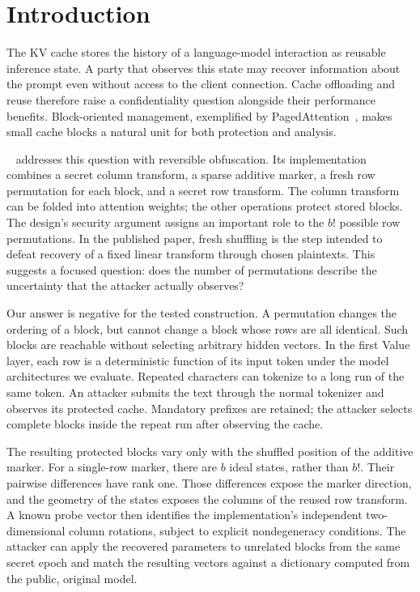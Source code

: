 \section{Introduction}
The KV cache stores the history of a language-model interaction as reusable inference state. A party that observes this state may recover information about the prompt even without access to the client connection. Cache offloading and reuse therefore raise a confidentiality question alongside their performance benefits. Block-oriented management, exemplified by PagedAttention~\cite{paged}, makes small cache blocks a natural unit for both protection and analysis.

\scheme{}~\cite{kvcloak} addresses this question with reversible obfuscation. Its implementation combines a secret column transform, a sparse additive marker, a fresh row permutation for each block, and a secret row transform. The column transform can be folded into attention weights; the other operations protect stored blocks. The design's security argument assigns an important role to the $b!$ possible row permutations. In the published paper, fresh shuffling is the step intended to defeat recovery of a fixed linear transform through chosen plaintexts. This suggests a focused question: does the number of permutations describe the uncertainty that the attacker actually observes?

Our answer is negative for the tested construction. A permutation changes the ordering of a block, but cannot change a block whose rows are all identical. Such blocks are reachable without selecting arbitrary hidden vectors. In the first Value layer, each row is a deterministic function of its input token under the model architectures we evaluate. Repeated characters can tokenize to a long run of the same token. An attacker submits the text through the normal tokenizer and observes its protected cache. Mandatory prefixes are retained; the attacker selects complete blocks inside the repeat run after observing the cache.

The resulting protected blocks vary only with the shuffled position of the additive marker. For a single-row marker, there are $b$ ideal states, rather than $b!$. Their pairwise differences have rank one. Those differences expose the marker direction, and the geometry of the states exposes the columns of the reused row transform. A known probe vector then identifies the implementation's independent two-dimensional column rotations, subject to explicit nondegeneracy conditions. The attacker can apply the recovered parameters to unrelated blocks from the same secret epoch and match the resulting vectors against a dictionary computed from the public, original model.


